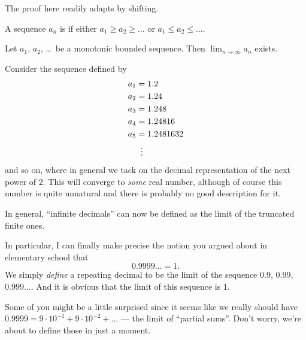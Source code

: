 The proof here readily adapts by shifting.
\begin{definition}
	A sequence $a_n$ is 
	if either $a_1 \ge a_2 \ge \dots$
	or $a_1 \le a_2 \le \dots$.
\end{definition}

\begin{theorem}
	Let $a_1$, $a_2$, \dots\ be a monotonic bounded sequence.
	Then $\lim_{n \to \infty} a_n$ exists.
	\label{thm:monotonic_bounded}
\end{theorem}

\begin{example}
	Consider the sequence defined by
	\begin{align*}
		a_1 &= 1.2 \\
		a_2 &= 1.24 \\
		a_3 &= 1.248 \\
		a_4 &= 1.24816 \\
		a_5 &= 1.2481632 \\
		&\vdotswithin=
	\end{align*}
	and so on, where in general we tack
	on the decimal representation of the next power of $2$.
	This will converge to \emph{some} real number,
	although of course this number
	is quite unnatural and there is probably no good description for it.
\end{example}
In general, ``infinite decimals''
can now be defined as the limit of the truncated finite ones.

\begin{example}
	[$0.9999\dots = 1$]
	In particular, I can finally make precise the notion
	you argued about in elementary school that
	\[ 0.9999\dots = 1. \]
	We simply \emph{define} a repeating decimal
	to be the limit of the sequence $0.9$, $0.99$, $0.999\dots$.
	And it is obvious that the limit of this sequence is $1$.
\end{example}

Some of you might be a little surprised since
it seems like we really should have
$0.9999 = 9 \cdot 10^{-1} + 9 \cdot 10^{-2} + \dots$ ---
the limit of ``partial sums''.
Don't worry, we're about to define those in just a moment.

\medskip

